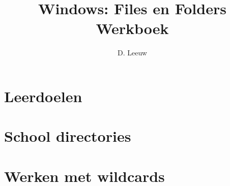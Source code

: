 \documentclass[a4paper,12pt,twoside,titlepage]{article}
\author{D. Leeuw}
\title{Windows: Files en Folders Werkboek}
\date{\today\\
0.0.0
\vfill
\raggedright
\copyright\ 2025-2026 Dennis Leeuw\\
}
\begin{document}

\maketitle



\section{Leerdoelen}


\section{School directories}


\section{Werken met wildcards}


\printindex
\end{document}
